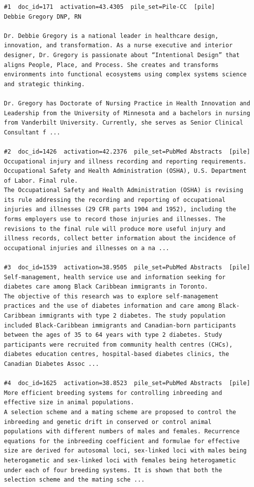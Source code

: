 \begin{verbatim}
#1  doc_id=171  activation=43.4305  pile_set=Pile-CC  [pile]
Debbie Gregory DNP, RN

Dr. Debbie Gregory is a national leader in healthcare design, innovation, and transformation. As a nurse executive and interior designer, Dr. Gregory is passionate about “Intentional Design” that aligns People, Place, and Process. She creates and transforms environments into functional ecosystems using complex systems science and strategic thinking.

Dr. Gregory has Doctorate of Nursing Practice in Health Innovation and Leadership from the University of Minnesota and a bachelors in nursing from Vanderbilt University. Currently, she serves as Senior Clinical Consultant f ...

#2  doc_id=1426  activation=42.2376  pile_set=PubMed Abstracts  [pile]
Occupational injury and illness recording and reporting requirements. Occupational Safety and Health Administration (OSHA), U.S. Department of Labor. Final rule.
The Occupational Safety and Health Administration (OSHA) is revising its rule addressing the recording and reporting of occupational injuries and illnesses (29 CFR parts 1904 and 1952), including the forms employers use to record those injuries and illnesses. The revisions to the final rule will produce more useful injury and illness records, collect better information about the incidence of occupational injuries and illnesses on a na ...

#3  doc_id=1539  activation=38.9505  pile_set=PubMed Abstracts  [pile]
Self-management, health service use and information seeking for diabetes care among Black Caribbean immigrants in Toronto.
The objective of this research was to explore self-management practices and the use of diabetes information and care among Black-Caribbean immigrants with type 2 diabetes. The study population included Black-Caribbean immigrants and Canadian-born participants between the ages of 35 to 64 years with type 2 diabetes. Study participants were recruited from community health centres (CHCs), diabetes education centres, hospital-based diabetes clinics, the Canadian Diabetes Assoc ...

#4  doc_id=1625  activation=38.8523  pile_set=PubMed Abstracts  [pile]
More efficient breeding systems for controlling inbreeding and effective size in animal populations.
A selection scheme and a mating scheme are proposed to control the inbreeding and genetic drift in conserved or control animal populations with different numbers of males and females. Recurrence equations for the inbreeding coefficient and formulae for effective size are derived for autosomal loci, sex-linked loci with males being heterogametic and sex-linked loci with females being heterogametic under each of four breeding systems. It is shown that both the selection scheme and the mating sche ...


\end{verbatim}
